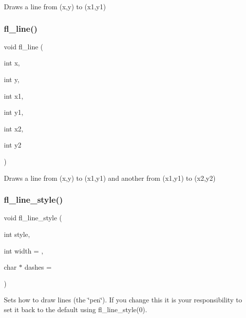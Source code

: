 Draws a line from (x,y) to (x1,y1) \mbox{\label{group__fl__drawings_ga28cc7813255d063edbd116d51c55fb31}} 
\subsubsection{\texorpdfstring{fl\+\_\+line()}{fl\_line()}\hspace{0.1cm}{\footnotesize\ttfamily [2/2]}}
{\footnotesize\ttfamily void fl\+\_\+line (\begin{DoxyParamCaption}\item[{int}]{x,  }\item[{int}]{y,  }\item[{int}]{x1,  }\item[{int}]{y1,  }\item[{int}]{x2,  }\item[{int}]{y2 }\end{DoxyParamCaption})\hspace{0.3cm}{\ttfamily [inline]}}

Draws a line from (x,y) to (x1,y1) and another from (x1,y1) to (x2,y2) \mbox{\label{group__fl__drawings_ga75ac53c05a97bbb01a22ff56a382f52d}} 
\subsubsection{\texorpdfstring{fl\+\_\+line\+\_\+style()}{fl\_line\_style()}}
{\footnotesize\ttfamily void fl\+\_\+line\+\_\+style (\begin{DoxyParamCaption}\item[{int}]{style,  }\item[{int}]{width = {},  }\item[{char $\ast$}]{dashes = {} }\end{DoxyParamCaption})\hspace{0.3cm}{\ttfamily [inline]}}

Sets how to draw lines (the \char`\"{}pen\char`\"{}). If you change this it is your responsibility to set it back to the default using {\ttfamily fl\+\_\+line\+\_\+style(0)}.


